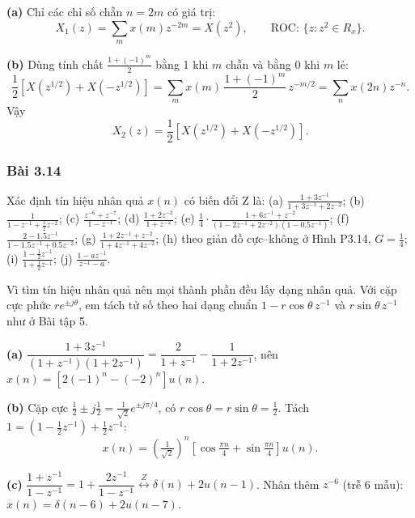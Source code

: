 \documentclass[12pt,a4paper]{article}
\newcommand{\zpair}{\overset{Z}{\longleftrightarrow}}
\begin{document}
\textbf{(a)} Chỉ các chỉ số chẵn $n = 2m$ có giá trị:
\[
    X_1(z) = \sum_{m} x(m) z^{-2m} = X(z^2), \qquad \text{ROC: } \{z : z^2 \in R_x\}.
\]

\textbf{(b)} Dùng tính chất $\frac{1 + (-1)^m}{2}$ bằng 1 khi $m$ chẵn và bằng 0 khi $m$ lẻ:
\[
    \frac{1}{2}\left[X\left(z^{1/2}\right) + X\left(-z^{1/2}\right)\right]
    = \sum_{m} x(m)\, \frac{1 + (-1)^m}{2}\, z^{-m/2}
    = \sum_{n} x(2n) z^{-n}.
\]
Vậy
\[
    X_2(z) = \frac{1}{2}\left[X\left(z^{1/2}\right) + X\left(-z^{1/2}\right)\right].
\]

\subsubsection*{Bài 3.14}
\begin{mdframed}[style=exbox]
Xác định tín hiệu nhân quả $x(n)$ có biến đổi Z là:
(a) $\frac{1 + 3z^{-1}}{1 + 3z^{-1} + 2z^{-2}}$;
(b) $\frac{1}{1 - z^{-1} + \frac{1}{2}z^{-2}}$;
(c) $\frac{z^{-6} + z^{-7}}{1 - z^{-1}}$;
(d) $\frac{1 + 2z^{-2}}{1 + z^{-2}}$;
(e) $\frac{1}{4}\cdot\frac{1 + 6z^{-1} + z^{-2}}{(1 - 2z^{-1} + 2z^{-2})(1 - 0.5z^{-1})}$;
(f) $\frac{2 - 1.5z^{-1}}{1 - 1.5z^{-1} + 0.5z^{-2}}$;
(g) $\frac{1 + 2z^{-1} + z^{-2}}{1 + 4z^{-1} + 4z^{-2}}$;
(h) theo giản đồ cực--không ở Hình P3.14, $G = \frac{1}{4}$;
(i) $\frac{1 - \frac{1}{2}z^{-1}}{1 + \frac{1}{2}z^{-1}}$;
(j) $\frac{1 - a z^{-1}}{z^{-1} - a}$.
\end{mdframed}

Vì tìm tín hiệu nhân quả nên mọi thành phần đều lấy dạng nhân quả. Với cặp cực phức $r e^{\pm j\theta}$, em tách tử số theo hai dạng chuẩn $1 - r\cos\theta\, z^{-1}$ và $r\sin\theta\, z^{-1}$ như ở Bài tập 5.

\textbf{(a)} $\dfrac{1 + 3z^{-1}}{(1 + z^{-1})(1 + 2z^{-1})} = \dfrac{2}{1 + z^{-1}} - \dfrac{1}{1 + 2z^{-1}}$, nên $x(n) = \left[2(-1)^n - (-2)^n\right] u(n)$.

\textbf{(b)} Cặp cực $\frac{1}{2} \pm j\frac{1}{2} = \frac{1}{\sqrt{2}} e^{\pm j\pi/4}$, có $r\cos\theta = r\sin\theta = \frac{1}{2}$. Tách $1 = \left(1 - \frac{1}{2}z^{-1}\right) + \frac{1}{2}z^{-1}$:
\[
    x(n) = \left(\tfrac{1}{\sqrt{2}}\right)^n \left[\cos\tfrac{\pi n}{4} + \sin\tfrac{\pi n}{4}\right] u(n).
\]

\textbf{(c)} $\dfrac{1 + z^{-1}}{1 - z^{-1}} = 1 + \dfrac{2z^{-1}}{1 - z^{-1}} \zpair \delta(n) + 2u(n-1)$. Nhân thêm $z^{-6}$ (trễ 6 mẫu): $x(n) = \delta(n-6) + 2u(n-7)$.
\end{document}
